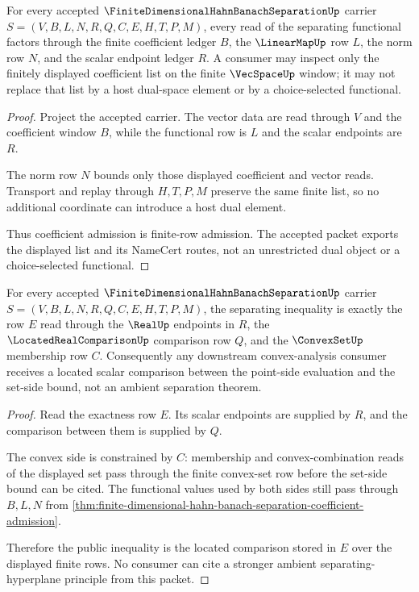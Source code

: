 \begin{theorem}
\label{thm:finite-dimensional-hahn-banach-separation-coefficient-admission}
For every accepted $\FiniteDimensionalHahnBanachSeparationUp$ carrier $S=(V,B,L,N,R,Q,C,E,H,T,P,M)$, every read of the separating functional factors through the finite coefficient ledger $B$, the $\LinearMapUp$ row $L$, the norm row $N$, and the scalar endpoint ledger $R$. A consumer may inspect only the finitely displayed coefficient list on the finite $\VecSpaceUp$ window; it may not replace that list by a host dual-space element or by a choice-selected functional.
\end{theorem}
\begin{proof}
Project the accepted carrier. The vector data are read through $V$ and the coefficient window $B$, while the functional row is $L$ and the scalar endpoints are $R$.

The norm row $N$ bounds only those displayed coefficient and vector reads. Transport and replay through $H,T,P,M$ preserve the same finite list, so no additional coordinate can introduce a host dual element.

Thus coefficient admission is finite-row admission. The accepted packet exports the displayed list and its NameCert routes, not an unrestricted dual object or a choice-selected functional.
\end{proof}

\begin{theorem}
\label{thm:finite-dimensional-hahn-banach-separation-inequality-exactness}
For every accepted $\FiniteDimensionalHahnBanachSeparationUp$ carrier $S=(V,B,L,N,R,Q,C,E,H,T,P,M)$, the separating inequality is exactly the row $E$ read through the $\RealUp$ endpoints in $R$, the $\LocatedRealComparisonUp$ comparison row $Q$, and the $\ConvexSetUp$ membership row $C$. Consequently any downstream convex-analysis consumer receives a located scalar comparison between the point-side evaluation and the set-side bound, not an ambient separation theorem.
\end{theorem}
\begin{proof}
Read the exactness row $E$. Its scalar endpoints are supplied by $R$, and the comparison between them is supplied by $Q$.

The convex side is constrained by $C$: membership and convex-combination reads of the displayed set pass through the finite convex-set row before the set-side bound can be cited. The functional values used by both sides still pass through $B,L,N$ from \autoref{thm:finite-dimensional-hahn-banach-separation-coefficient-admission}.

Therefore the public inequality is the located comparison stored in $E$ over the displayed finite rows. No consumer can cite a stronger ambient separating-hyperplane principle from this packet.
\end{proof}

